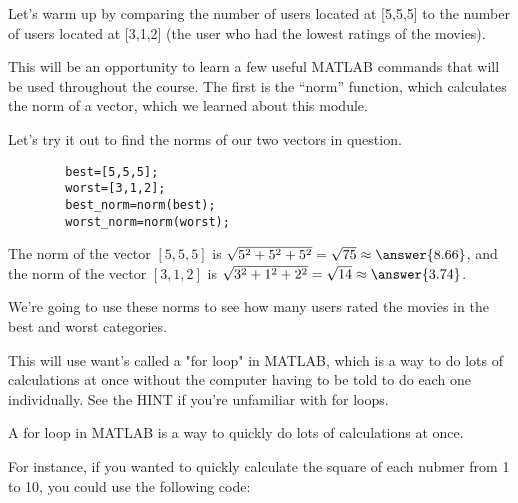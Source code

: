 \documentclass{ximera}
\begin{document}
  \begin{exploration}
  
 Let's warm up by comparing the number of users located at [5,5,5] to the number of users located at [3,1,2] (the user who had the lowest ratings of the movies).

  This will be an opportunity to learn a few useful MATLAB commands that will be used throughout the course. The first is the ``norm'' function, which calculates the norm of a vector, which we learned about this module.

  Let's try it out to find the norms of our two vectors in question. 

  \begin{remark}
    \begin{verbatim}
        best=[5,5,5];
        worst=[3,1,2];
        best_norm=norm(best);
        worst_norm=norm(worst);
    \end{verbatim}
  \end{remark}

  \begin{example}

    The norm of the vector $[5,5,5]$ is $\sqrt{5^2+5^2+5^2}=\sqrt{75}\approx \answer{8.66}$, and the norm of the vector $[3,1,2]$ is $\sqrt{3^2+1^2+2^2}=\sqrt{14}\approx \answer{3.74}$.

  \end{example}

  We're going to use these norms to see how many users rated the movies in the best and worst categories. 
  
  This will use want's called a "for loop" in MATLAB, which is a way to do lots of calculations at once without the computer having to be told to do each one individually. See the HINT if you're unfamiliar with for loops.




  
  \begin{hint}
      
      A for loop in MATLAB is a way to quickly do lots of calculations at once.

  For instance, if you wanted to quickly calculate the square of each nubmer from 1 to 10, you could use the following code:
  \begin{verbatim}


\end{verbatim}
\end{hint}
\end{exploration}
\end{document}
